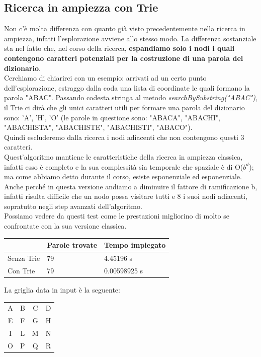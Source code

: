 \documentclass[10pt,a4paper]{article}
\begin{document}
	\subsection{Ricerca in ampiezza con Trie}
	Non c'è molta differenza con quanto già visto precedentemente nella ricerca in ampiezza, infatti l'esplorazione avviene allo stesso modo. La differenza sostanziale sta nel fatto che, nel corso della ricerca, \textbf{espandiamo solo i nodi i quali contengono caratteri potenziali per la costruzione di una parola del dizionario}.\\
	Cerchiamo di chiarirci con un esempio: arrivati ad un certo punto dell'esplorazione, estraggo dalla coda una lista di coordinate le quali formano la parola "ABAC". Passando codesta stringa al metodo \textit{searchBySubstring("ABAC")}, il Trie ci dirà che gli unici caratteri utili per formare una parola del dizionario sono: 'A', 'H', 'O' (le parole in questione sono: "ABACA", "ABACHI", "ABACHISTA", "ABACHISTE", "ABACHISTI", "ABACO").\\
	Quindi escluderemo dalla ricerca i nodi adiacenti che non contengono questi 3 caratteri.\\
	Quest'algoritmo mantiene le caratteristiche della ricerca in ampiezza classica, infatti esso è completo e la sua complessità sia temporale che spaziale è di O($b^d$); ma come abbiamo detto durante il corso, esiste esponenziale ed esponenziale.\\
	Anche perché in questa versione andiamo a diminuire il fattore di ramificazione b, infatti risulta difficile che un nodo possa visitare tutti e 8 i suoi nodi adiacenti, sopratutto negli step avanzati dell'algoritmo.\\
	Possiamo vedere da questi test come le prestazioni migliorino di molto se confrontate con la sua versione classica.
	\begin{center}
		\begin{tabular}{ |p{2cm}||p{3cm}|p{3cm}| }
			\hline
			& Parole trovate & Tempo impiegato\\
			\hline
			Senza Trie & 79 & 4.45196 s \\
			Con Trie & 79 & 0.00598925 s \\
			\hline
		\end{tabular}
	\end{center}
	La griglia data in input è la seguente:
	\begin{tabular}{ |c c c c| } 
		\hline
		A & B & C & D \\ 
		E & F & G & H \\ 
		I & L & M & N \\ 
		O & P & Q & R \\
		\hline
	\end{tabular}
\end{document}
